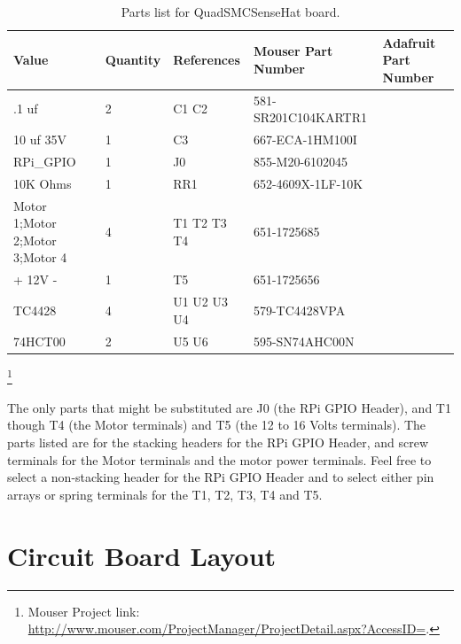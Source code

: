 \begin{table}[htdp]                                                            
\begin{centering}\begin{tabular}{|l|l|p{1in}|l|p{.5in}|}                       
\hline                                                                         
Value&Quantity&References&Mouser Part Number&Adafruit Part Number \\
\hline
.1 uf&2&C1 C2&581-SR201C104KARTR1& \\
\hline
10 uf 35V&1&C3&667-ECA-1HM100I& \\
\hline
RPi\_GPIO&1&J0&855-M20-6102045& \\
\hline
10K Ohms&1&RR1&652-4609X-1LF-10K& \\
\hline
Motor 1;Motor 2;Motor 3;Motor 4&4&T1 T2 T3 T4&651-1725685& \\
\hline
+ 12V -&1&T5&651-1725656& \\
\hline
TC4428&4&U1 U2 U3 U4&579-TC4428VPA& \\
\hline
74HCT00&2&U5 U6&595-SN74AHC00N& \\
\hline
\end{tabular}
\caption{Parts list for QuadSMCSenseHat board.}
\end{centering}\end{table}\footnote{Mouser Project link: 
\url{http://www.mouser.com/ProjectManager/ProjectDetail.aspx?AccessID=}.}


The only parts that might be substituted are J0 (the RPi GPIO Header), and T1 
though T4 (the Motor terminals) and T5 (the 12 to 16 Volts terminals).  The parts 
listed are for the stacking headers for the RPi GPIO Header, and screw 
terminals for the Motor terminals and the motor power terminals.  Feel free to 
select a non-stacking header for the RPi GPIO Header and to select either pin 
arrays or spring terminals for the T1, T2, T3, T4 and T5.

\section{Circuit Board Layout}

